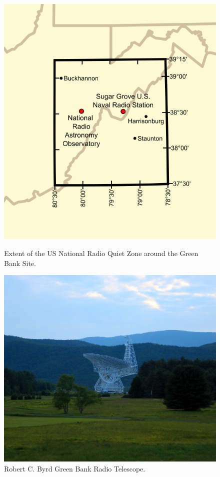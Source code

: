 \begin{figure}[htb]
\centering
\begin{minipage}[b]{0.47\textwidth}
\centering
\includegraphics[width=0.75\linewidth]{RFI_testing/figures/National_Radio_Quiet_Zone.png}
\caption{Extent of the US National Radio Quiet Zone around the Green Bank Site.}
\label{Fig:nrqz}
\end{minipage}%
\begin{minipage}[b]{0.02\textwidth}
\hspace{1cm}
\end{minipage}%
\begin{minipage}[b]{0.47\textwidth}
\centering
\includegraphics[width=0.95\linewidth]{RFI_testing/figures/gbt_site.jpg}
\caption{Robert C. Byrd Green Bank Radio Telescope. }
\label{Fig:gbt}
\end{minipage}
\end{figure}

